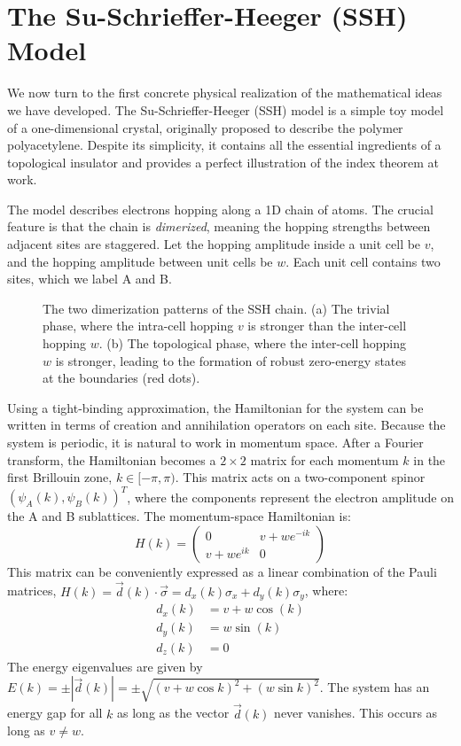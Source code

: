 \section{The Su-Schrieffer-Heeger (SSH) Model}
\label{sec:ssh_model}

We now turn to the first concrete physical realization of the mathematical ideas we have developed.
The Su-Schrieffer-Heeger (SSH) model is a simple toy model of a one-dimensional crystal, originally proposed to describe the polymer polyacetylene.
Despite its simplicity, it contains all the essential ingredients of a topological insulator and provides a perfect illustration of the index theorem at work.

The model describes electrons hopping along a 1D chain of atoms.
The crucial feature is that the chain is \textit{dimerized}, meaning the hopping strengths between adjacent sites are staggered.
Let the hopping amplitude inside a unit cell be $v$, and the hopping amplitude between unit cells be $w$.
Each unit cell contains two sites, which we label A and B.

\begin{figure}[htbp]
    \centering
    
    \caption{The two dimerization patterns of the SSH chain. (a) The trivial phase, where the intra-cell hopping $v$ is stronger than the inter-cell hopping $w$. (b) The topological phase, where the inter-cell hopping $w$ is stronger, leading to the formation of robust zero-energy states at the boundaries (red dots).}
    \label{fig:ssh_dimerization}
\end{figure}

Using a tight-binding approximation, the Hamiltonian for the system can be written in terms of creation and annihilation operators on each site.
Because the system is periodic, it is natural to work in momentum space.
After a Fourier transform, the Hamiltonian becomes a $2 \times 2$ matrix for each momentum $k$ in the first Brillouin zone, $k \in [-\pi, \pi)$.
This matrix acts on a two-component spinor $(\psi_A(k), \psi_B(k))^T$, where the components represent the electron amplitude on the A and B sublattices.
The momentum-space Hamiltonian is:
\begin{equation}
    H(k) = \begin{pmatrix} 0 & v + w e^{-ik} \\ v + w e^{ik} & 0 \end{pmatrix}
\end{equation}
This matrix can be conveniently expressed as a linear combination of the Pauli matrices, $H(k) = \vec{d}(k) \cdot \vec{\sigma} = d_x(k)\sigma_x + d_y(k)\sigma_y$, where:
\begin{align}
    d_x(k) &= v + w \cos(k) \\
    d_y(k) &= w \sin(k) \\
    d_z(k) &= 0
\end{align}
The energy eigenvalues are given by $E(k) = \pm |\vec{d}(k)| = \pm\sqrt{(v+w\cos k)^2 + (w\sin k)^2}$.
The system has an energy gap for all $k$ as long as the vector $\vec{d}(k)$ never vanishes.
This occurs as long as $v \neq w$.

